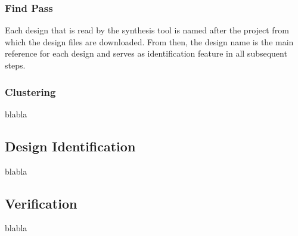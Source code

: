 \subsubsection{Find Pass} 
Each design that is read by the synthesis tool is named after the project from
which the design files are downloaded. From then, the design name is the main
reference for each design and serves as identification feature in all
subsequent steps.

\subsubsection{Clustering}
blabla

\subsection{Design Identification}
blabla

\subsection{Verification}
blabla




